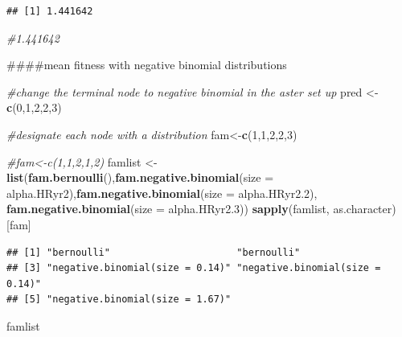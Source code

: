 \documentclass[
]{article}
\newenvironment{Shaded}{\begin{snugshade}}{\end{snugshade}}
\newcommand{\AttributeTok}[1]{\textcolor[rgb]{0.13,0.29,0.53}{#1}}
\newcommand{\CommentTok}[1]{\textcolor[rgb]{0.56,0.35,0.01}{\textit{#1}}}
\newcommand{\DecValTok}[1]{\textcolor[rgb]{0.00,0.00,0.81}{#1}}
\newcommand{\FloatTok}[1]{\textcolor[rgb]{0.00,0.00,0.81}{#1}}
\newcommand{\FunctionTok}[1]{\textcolor[rgb]{0.13,0.29,0.53}{\textbf{#1}}}
\newcommand{\NormalTok}[1]{#1}
\newcommand{\OtherTok}[1]{\textcolor[rgb]{0.56,0.35,0.01}{#1}}
\begin{document}
\begin{verbatim}
## [1] 1.441642
\end{verbatim}

\begin{Shaded}
\begin{Highlighting}[]
\CommentTok{\#1.441642}
\end{Highlighting}
\end{Shaded}

\#\#\#\#mean fitness with negative binomial distributions

\begin{Shaded}
\begin{Highlighting}[]
\CommentTok{\#change the terminal node to negative binomial in the aster set up }
\NormalTok{pred }\OtherTok{\textless{}{-}} \FunctionTok{c}\NormalTok{(}\DecValTok{0}\NormalTok{,}\DecValTok{1}\NormalTok{,}\DecValTok{2}\NormalTok{,}\DecValTok{2}\NormalTok{,}\DecValTok{3}\NormalTok{)}

\CommentTok{\#designate each node with a distribution}
\NormalTok{fam}\OtherTok{\textless{}{-}}\FunctionTok{c}\NormalTok{(}\DecValTok{1}\NormalTok{,}\DecValTok{1}\NormalTok{,}\DecValTok{2}\NormalTok{,}\DecValTok{2}\NormalTok{,}\DecValTok{3}\NormalTok{)}

\CommentTok{\#fam\textless{}{-}c(1,1,2,1,2)}
\NormalTok{famlist }\OtherTok{\textless{}{-}} \FunctionTok{list}\NormalTok{(}\FunctionTok{fam.bernoulli}\NormalTok{(),}\FunctionTok{fam.negative.binomial}\NormalTok{(}\AttributeTok{size =}\NormalTok{ alpha.HRyr2),}\FunctionTok{fam.negative.binomial}\NormalTok{(}\AttributeTok{size =}\NormalTok{ alpha.HRyr2}\FloatTok{.2}\NormalTok{), }\FunctionTok{fam.negative.binomial}\NormalTok{(}\AttributeTok{size =}\NormalTok{ alpha.HRyr2}\FloatTok{.3}\NormalTok{))}
\FunctionTok{sapply}\NormalTok{(famlist, as.character)[fam] }
\end{Highlighting}
\end{Shaded}

\begin{verbatim}
## [1] "bernoulli"                      "bernoulli"                     
## [3] "negative.binomial(size = 0.14)" "negative.binomial(size = 0.14)"
## [5] "negative.binomial(size = 1.67)"
\end{verbatim}

\begin{Shaded}
\begin{Highlighting}[]
\NormalTok{famlist}
\end{Highlighting}
\end{Shaded}
\end{document}
